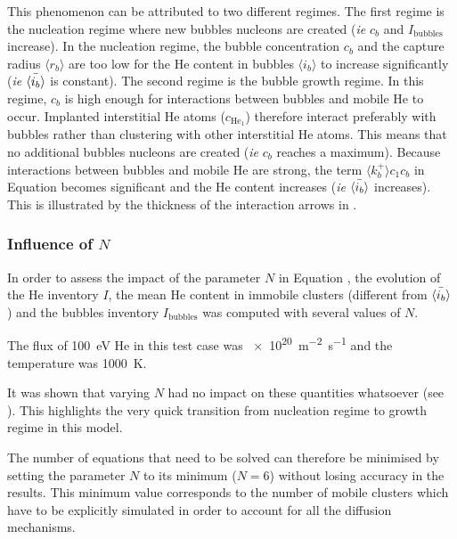 This phenomenon can be attributed to two different regimes.
The first regime is the nucleation regime where new bubbles nucleons are created (\textit{ie} $c_b$ and $I_\mathrm{bubbles}$ increase).
In the nucleation regime, the bubble concentration $c_b$ and the capture radius $\langle r_b \rangle$ are too low for the He content in bubbles $\langle i_b \rangle$ to increase significantly (\textit{ie} $\Bar{\langle i_b \rangle}$ is constant).
The second regime is the bubble growth regime.
In this regime, $c_b$ is high enough for interactions between bubbles and mobile He to occur.
Implanted interstitial He atoms ($c_{\mathrm{He}_1}$) therefore interact preferably with bubbles rather than clustering with other interstitial He atoms.
This means that no additional bubbles nucleons are created (\textit{ie} $c_b$ reaches a maximum).
Because interactions between bubbles and mobile He are strong, the term $\langle k_b^+ \rangle c_1 c_b$ in Equation  becomes significant and the He content increases (\textit{ie} $\Bar{\langle i_b \rangle}$ increases).
This is illustrated by the thickness of the interaction arrows in .


\subsubsection{Influence of $N$} 
In order to assess the impact of the parameter $N$ in Equation , the evolution of the He inventory $I$, the mean He content in immobile clusters (different from $\Bar{\langle i_b \rangle}$) and the bubbles inventory $I_\mathrm{bubbles}$ was computed with several values of $N$.

The flux of \SI{100}{eV} He in this test case was \SI{e20}{m^{-2} s^{-1}} and the temperature was \SI{1000}{K}. 

It was shown that varying $N$ had no impact on these quantities whatsoever (see ).
This highlights the very quick transition from nucleation regime to growth regime in this model.

The number of equations that need to be solved can therefore be minimised by setting the parameter $N$ to its minimum ($N=6$) without losing accuracy in the results.
This minimum value corresponds to the number of mobile clusters which have to be explicitly simulated in order to account for all the diffusion mechanisms.

